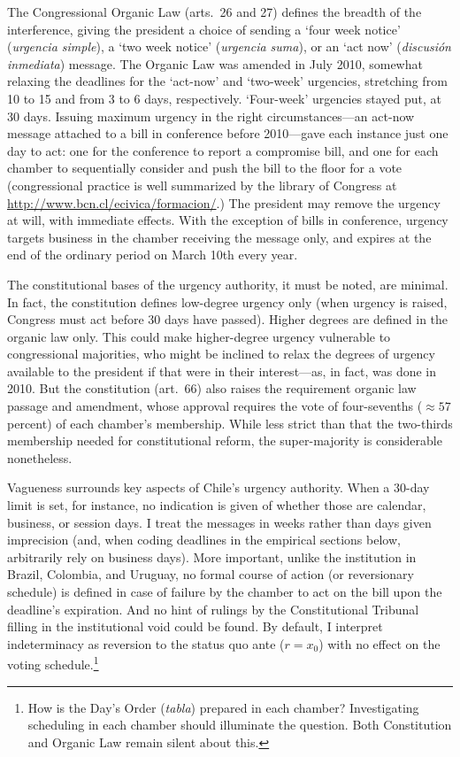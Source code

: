 \documentclass[letter,12pt]{article}
\begin{document}
The Congressional Organic Law (arts.\ 26 and 27) defines the breadth of the interference, giving the president a choice of sending a `four week notice' (\emph{urgencia simple}), a `two week notice' (\emph{urgencia suma}), or an `act now' (\emph{discusión inmediata}) message. The Organic Law was amended in July 2010, somewhat relaxing the deadlines for the `act-now' and `two-week' urgencies, stretching from 10 to 15 and from 3 to 6 days, respectively. `Four-week' urgencies stayed put, at 30 days. Issuing maximum urgency in the right circumstances---an act-now message attached to a bill in conference before 2010---gave each instance just one day to act: one for the conference to report a compromise bill, and one for each chamber to sequentially consider and push the bill to the floor for a vote (congressional practice is well summarized by the library of Congress at \url{http://www.bcn.cl/ecivica/formacion/}.) The president may remove the urgency at will, with immediate effects. With the exception of bills in conference, urgency targets business in the chamber receiving the message only, and expires at the end of the ordinary period on March 10th every year. 

The constitutional bases of the urgency authority, it must be noted, are minimal. In fact, the constitution defines low-degree urgency only (when urgency is raised, Congress must act before 30 days have passed). Higher degrees are defined in the organic law only. This could make higher-degree urgency vulnerable to congressional majorities, who might be inclined to relax the degrees of urgency available to the president if that were in their interest---as, in fact, was done in 2010. But the constitution (art.~66) also raises the requirement organic law passage and amendment, whose approval requires the vote of four-sevenths ($\approx 57$ percent) of each chamber's membership. While less strict than that the two-thirds membership needed for constitutional reform, the super-majority is considerable nonetheless. 

Vagueness surrounds key aspects of Chile's urgency authority. When a 30-day limit is set, for instance, no indication is given of whether those are calendar, business, or session days. I treat the messages in weeks rather than days given imprecision (and, when coding deadlines in the empirical sections below, arbitrarily rely on business days). More important, unlike the institution in Brazil, Colombia, and Uruguay, no formal course of action (or reversionary schedule) is defined in case of failure by the chamber to act on the bill upon the deadline's expiration. And no hint of rulings by the Constitutional Tribunal filling in the institutional void could be found. By default, I interpret indeterminacy as reversion to the status quo ante ($r=x_0$) with no effect on the voting schedule.\footnote{How is the Day's Order (\emph{tabla}) prepared in each chamber? Investigating scheduling in each chamber should illuminate the question. Both Constitution and Organic Law remain silent about this.} 
\end{document}
